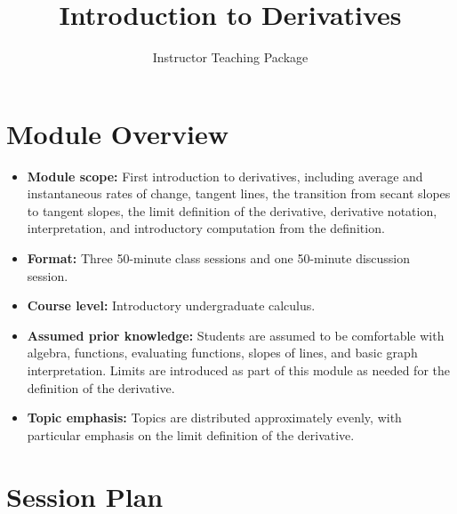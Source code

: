 \documentclass{article}
\title{Introduction to Derivatives}
\author{Instructor Teaching Package}
\date{}
\begin{document}
\maketitle

\section*{Module Overview}

\begin{itemize}
    \item \textbf{Module scope:} First introduction to derivatives, including average and instantaneous rates of change, tangent lines, the transition from secant slopes to tangent slopes, the limit definition of the derivative, derivative notation, interpretation, and introductory computation from the definition.
    \item \textbf{Format:} Three 50-minute class sessions and one 50-minute discussion session.
    \item \textbf{Course level:} Introductory undergraduate calculus.
    \item \textbf{Assumed prior knowledge:} Students are assumed to be comfortable with algebra, functions, evaluating functions, slopes of lines, and basic graph interpretation. Limits are introduced as part of this module as needed for the definition of the derivative.
    \item \textbf{Topic emphasis:} Topics are distributed approximately evenly, with particular emphasis on the limit definition of the derivative.
\end{itemize}

\section*{Session Plan}
\end{document}
